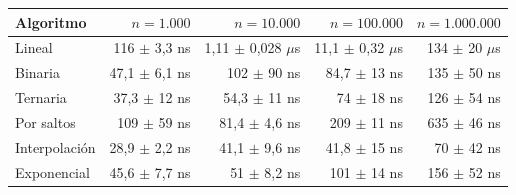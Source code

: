 {\scriptsize
\begin{tabular}{lrrrr}
\toprule
Algoritmo & $n=1.000$ & $n=10.000$ & $n=100.000$ & $n=1.000.000$ \\
\midrule
Lineal & 116 $\pm$ 3,3 ns & 1,11 $\pm$ 0,028 $\mu$s & 11,1 $\pm$ 0,32 $\mu$s & 134 $\pm$ 20 $\mu$s \\
Binaria & 47,1 $\pm$ 6,1 ns & 102 $\pm$ 90 ns & 84,7 $\pm$ 13 ns & 135 $\pm$ 50 ns \\
Ternaria & 37,3 $\pm$ 12 ns & 54,3 $\pm$ 11 ns & 74 $\pm$ 18 ns & 126 $\pm$ 54 ns \\
Por saltos & 109 $\pm$ 59 ns & 81,4 $\pm$ 4,6 ns & 209 $\pm$ 11 ns & 635 $\pm$ 46 ns \\
Interpolaci\'on & 28,9 $\pm$ 2,2 ns & 41,1 $\pm$ 9,6 ns & 41,8 $\pm$ 15 ns & 70 $\pm$ 42 ns \\
Exponencial & 45,6 $\pm$ 7,7 ns & 51 $\pm$ 8,2 ns & 101 $\pm$ 14 ns & 156 $\pm$ 52 ns \\
\bottomrule
\end{tabular}}\par
